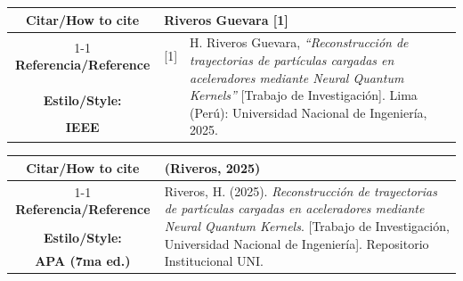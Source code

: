 \begin{table}[h]
    \centering
    \renewcommand{\arraystretch}{1.3} %
    \begin{tabular}{c l p{10cm}}
        \toprule
        \bf \centering Citar/How to cite & \multicolumn{2}{l}{Riveros Guevara [1]} \\ \cline{1-1}
        \bf \centering Referencia/Reference & [1] & \multirow{4}{10cm}{H. Riveros Guevara, \textit{``Reconstrucción de trayectorias de partículas cargadas
en aceleradores mediante Neural Quantum Kernels''} [Trabajo de Investigación]. Lima (Perú): Universidad Nacional de Ingeniería, 2025.} \\ 
        &  & \\
       \bf   Estilo/Style: & &  \\
       \bf     IEEE & &  \\
        \bottomrule
    \end{tabular}
\end{table}

\vspace{1cm} %

\begin{table}[h]
    \centering
    \renewcommand{\arraystretch}{1.3} %
    \begin{tabular}{cp{11cm}}
        \toprule
        \textbf{Citar/How to cite} & (Riveros, 2025)\\ \cline{1-1}
        \textbf{Referencia/Reference} &   \multirow{4}{11cm}{\hangindent=1.2cm \hangafter=1 Riveros, H. (2025). \textit{Reconstrucción de trayectorias de partículas cargadas
en aceleradores mediante Neural Quantum Kernels}. [Trabajo de Investigación, Universidad Nacional de Ingeniería]. Repositorio Institucional UNI.} \\ 
        &  \\
        \bf Estilo/Style: &  \\
        \bf APA (7ma ed.) &   \\ \bottomrule
    \end{tabular}
\end{table}

\newpage 